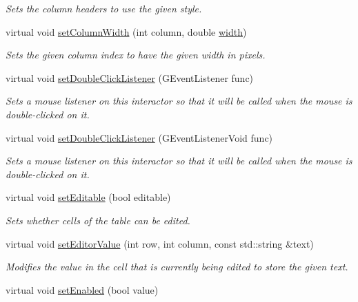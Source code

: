 \begin{DoxyCompactItemize}
\begin{DoxyCompactList}\small\item\em Sets the column headers to use the given style. \end{DoxyCompactList}\item 
virtual void \mbox{\hyperlink{classGTable_a52075dc231c73a896bcef426047fd327}{set\+Column\+Width}} (int column, double \mbox{\hyperlink{classGTable_ad72663daf610f2a0833a2fc3d78e4fdf}{width}})
\begin{DoxyCompactList}\small\item\em Sets the given column index to have the given width in pixels. \end{DoxyCompactList}\item 
virtual void \mbox{\hyperlink{classGInteractor_ac29f9a3462458e165fae3a1f046ee77a}{set\+Double\+Click\+Listener}} (G\+Event\+Listener func)
\begin{DoxyCompactList}\small\item\em Sets a mouse listener on this interactor so that it will be called when the mouse is double-\/clicked on it. \end{DoxyCompactList}\item 
virtual void \mbox{\hyperlink{classGInteractor_a50096194d66f48c92dd4c512d41bfc76}{set\+Double\+Click\+Listener}} (G\+Event\+Listener\+Void func)
\begin{DoxyCompactList}\small\item\em Sets a mouse listener on this interactor so that it will be called when the mouse is double-\/clicked on it. \end{DoxyCompactList}\item 
virtual void \mbox{\hyperlink{classGTable_a52455aaff9ee352ca405fa61ba246b84}{set\+Editable}} (bool editable)
\begin{DoxyCompactList}\small\item\em Sets whether cells of the table can be edited. \end{DoxyCompactList}\item 
virtual void \mbox{\hyperlink{classGTable_aaefc85e4ff762ca176a90ebac163f2c0}{set\+Editor\+Value}} (int row, int column, const std\+::string \&text)
\begin{DoxyCompactList}\small\item\em Modifies the value in the cell that is currently being edited to store the given text. \end{DoxyCompactList}\item 
virtual void \mbox{\hyperlink{classGInteractor_ab831367dd84bbd579e02e55bacb21343}{set\+Enabled}} (bool value)

\end{DoxyCompactItemize}
